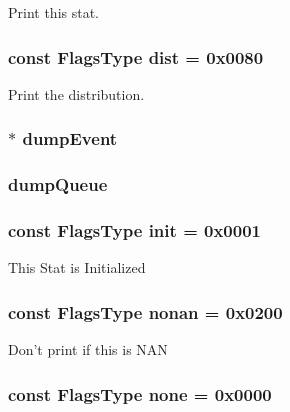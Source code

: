 \label{namespaceStats_a4f0406c9859ba486a98825d53a233056}
Print this stat. \hypertarget{namespaceStats_a25cf6f3e458aaa5fdf87fc287ef0376e}{
\subsubsection[{dist}]{\setlength{\rightskip}{0pt plus 5cm}const {\bf FlagsType} {\bf dist} = 0x0080}}
\label{namespaceStats_a25cf6f3e458aaa5fdf87fc287ef0376e}
Print the distribution. \hypertarget{namespaceStats_aa19087402d9c677e9af38e996e8fab55}{
\subsubsection[{dumpEvent}]{$\ast$ {\bf dumpEvent}}}
\label{namespaceStats_aa19087402d9c677e9af38e996e8fab55}
\hypertarget{namespaceStats_a4fbe68e945e186a583e0e4be24387628}{
\subsubsection[{dumpQueue}]{ {\bf dumpQueue}}}
\label{namespaceStats_a4fbe68e945e186a583e0e4be24387628}
\hypertarget{namespaceStats_aa1f55d332b4c8393735b7f1d87098beb}{
\subsubsection[{init}]{\setlength{\rightskip}{0pt plus 5cm}const {\bf FlagsType} {\bf init} = 0x0001}}
\label{namespaceStats_aa1f55d332b4c8393735b7f1d87098beb}
This Stat is Initialized \hypertarget{namespaceStats_a8e574059d445838aa4d851c263cb0e78}{
\subsubsection[{nonan}]{\setlength{\rightskip}{0pt plus 5cm}const {\bf FlagsType} {\bf nonan} = 0x0200}}
\label{namespaceStats_a8e574059d445838aa4d851c263cb0e78}
Don't print if this is NAN \hypertarget{namespaceStats_adaca029bee6973514c46aa649f669b21}{
\subsubsection[{none}]{\setlength{\rightskip}{0pt plus 5cm}const {\bf FlagsType} {\bf none} = 0x0000}}

